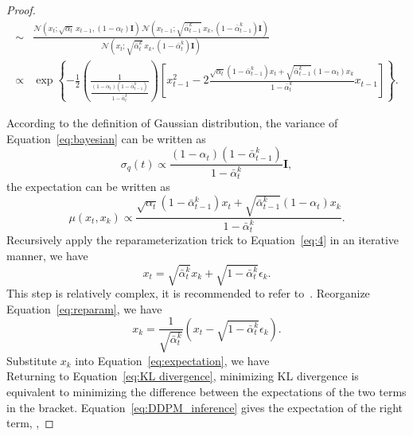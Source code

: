 \begin{proof}
{\begin{minipage}{0.5\textwidth}
\begin{align*}
  \sim & \frac{\mathcal{N}(x_t; \sqrt{\alpha_t} \, x_{t-1}, (1 - \alpha_t) \mathbf{I}) \, \mathcal{N}(x_{t-1}; \sqrt{\bar{\alpha}_{t-1}^k} \, x_k, (1 - \bar{\alpha}_{t-1}^k) \mathbf{I})}{\mathcal{N}(x_t; \sqrt{\bar{\alpha}_t^k} \, x_k, (1 - \bar{\alpha}_t^k) \mathbf{I})}\\
\propto& \exp\left\{ -\frac{1}{2} \left( \frac{1}{\frac{(1 - \alpha_t) (1 - \bar{\alpha}_{t-1}^k)}{1 - \bar{\alpha}_t^k}} \right) \left[ x_{t-1}^2 -2\frac{ \sqrt{\alpha_t}  (1 - \bar{\alpha}_{t-1}^k) x_t + \sqrt{\bar{\alpha}_{t-1}^k} (1 - \alpha_t) x_k}{1 - \bar{\alpha}_t^k} x_{t-1} \right] \right\}.
\end{align*}
\end{minipage}}
According to the definition of Gaussian distribution, the variance of Equation~\ref{eq:bayesian} can be written as
$$
\sigma_q(t) \propto \frac{(1 - \alpha_t)(1 - \bar{\alpha}_{t-1}^k)}{1 - \bar{\alpha}_t^k} \mathbf{I},
$$
the expectation can be written as
\begin{equation}\label{eq:expectation}
\mu(x_t,x_k) \propto \frac{\sqrt{\alpha_t} (1 - \bar{\alpha}_{t-1}^k) x_t + \sqrt{\bar{\alpha}_{t-1}^k} (1 - \alpha_t) x_k}{1 - \bar{\alpha}_t^k}.
\end{equation}
Recursively apply the reparameterization trick to Equation~\ref{eq:4} in an iterative manner, we have
\begin{equation}\label{eq:reparam}
    x_t = \sqrt{\bar{\alpha}_t^k}x_k + \sqrt{1-\bar{\alpha}_t^k} \epsilon_k.
\end{equation}
This step is relatively complex, it is recommended to refer to~\citet{understand_DDPM}.
Reorganize Equation~\ref{eq:reparam}, we have
$$
    x_k = \frac{1}{\sqrt{\bar{\alpha}_t^k}}(x_t-\sqrt{1-\bar{\alpha}_t^k} \epsilon_k).
$$
Substitute $x_k$ into Equation~\ref{eq:expectation}, we have\\
Returning to Equation~\ref{eq:KL divergence}, minimizing KL divergence is equivalent to minimizing the difference between the expectations of the two terms in the bracket. Equation~\ref{eq:DDPM_inference} gives the expectation of the right term, \ie,

\end{proof}
